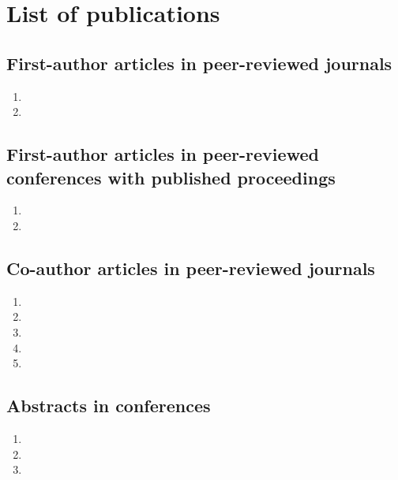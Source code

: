 \chapter{List of publications}

\doublespacing

\section*{First-author articles in peer-reviewed journals} %
\label{sec:first_author_journal_articles}
\begin{enumerate}
  \item {}
  \item {}
\end{enumerate}

\section*{First-author articles in peer-reviewed conferences with published proceedings}
\label{sec:first_author_peer_reviewed_conference_papers}
\begin{enumerate}
  \item {}
  \item {}
\end{enumerate}

\section*{Co-author articles in peer-reviewed journals} %
\label{sec:journal_articles}
\begin{enumerate}
  \item {}
  \item {}
  \item {}
  \item {}
  \item {}%
\end{enumerate}

\section*{Abstracts in conferences} %
\label{sec:abstracts}
\begin{enumerate}
  \item {}
  \item {}
  \item {}
\end{enumerate}

\onehalfspacing

